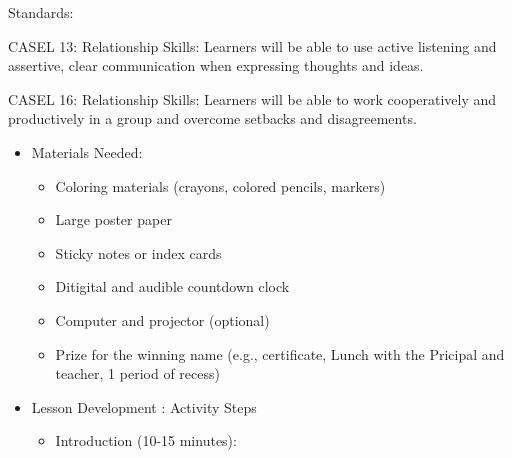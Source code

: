 \documentclass[14pt, letterpaper, twoside]{article}
\begin{document}
	Standards: 
	
	CASEL 13: Relationship Skills: Learners will be able to use active listening and assertive, clear communication when expressing thoughts and ideas.
	
	CASEL 16: Relationship Skills: Learners will be able to work cooperatively and productively in a group and overcome setbacks and disagreements.

	\begin{itemize}
	\item Materials Needed:
		\begin{itemize}
    		\item Coloring materials (crayons, colored pencils, markers)
    		\item Large poster paper
    		\item Sticky notes or index cards
    		\item Ditigital and audible countdown clock
    		\item Computer and projector (optional)
    		\item Prize for the winning name (e.g., certificate, Lunch with the Pricipal and teacher, 1 period of recess)
		\end{itemize}
	\item Lesson Development : Activity Steps
		\begin{itemize}
    		\item Introduction (10-15 minutes):
    		

\end{itemize}
\end{itemize}
\end{document}
